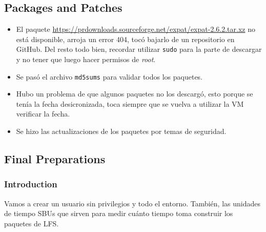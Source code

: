 \documentclass{article}
\begin{document}
\subsection{Packages and Patches}

\begin{itemize}
  \item El paquete \url{https://prdownloads.sourceforge.net/expat/expat-2.6.2.tar.xz} no está disponible, arroja un error 404, tocó bajarlo de un repositorio en GitHub. Del resto todo bien, recordar utilizar \texttt{sudo} para la parte de descargar y no tener que luego hacer permisos de \textit{root}.
  \item Se pasó el archivo \texttt{md5sums} para validar todos los paquetes.
  \item Hubo un problema de que algunos paquetes no los descargó, esto porque se tenía la fecha desicronizada, toca siempre que se vuelva a utilizar la VM verificar la fecha.
  \item Se hizo las actualizaciones de los paquetes por temas de seguridad.

\end{itemize}



\subsection{Final Preparations}

\subsubsection{Introduction}

Vamos a crear un usuario sin privilegios y todo el entorno. También, las unidades de tiempo SBUs que sirven para medir cuánto tiempo toma construir los paquetes de LFS.
\end{document}
